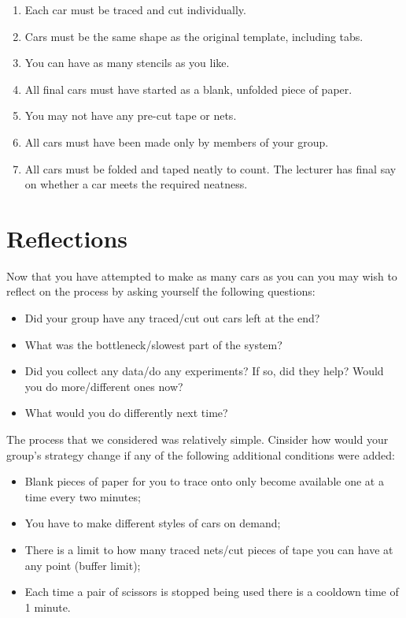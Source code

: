 \documentclass[
  10pt,
  a4paperpaper,
  DIV=11,
  numbers=noendperiod,
  oneside]{scrreprt}
\providecommand{\tightlist}{%
  \setlength{\itemsep}{0pt}\setlength{\parskip}{0pt}}\usepackage{longtable,booktabs,array}
\begin{document}
\begin{enumerate}
\def\labelenumi{\arabic{enumi}.}
\tightlist
\item
  Each car must be traced and cut individually.
\item
  Cars must be the same shape as the original template, including tabs.
\item
  You can have as many stencils as you like.
\item
  All final cars must have started as a blank, unfolded piece of paper.
\item
  You may not have any pre-cut tape or nets.
\item
  All cars must have been made only by members of your group.
\item
  All cars must be folded and taped neatly to count. The lecturer has
  final say on whether a car meets the required neatness.
\end{enumerate}

\section{Reflections}\label{reflections}

Now that you have attempted to make as many cars as you can you may wish
to reflect on the process by asking yourself the following questions:

\begin{itemize}
\tightlist
\item
  Did your group have any traced/cut out cars left at the end?
\item
  What was the bottleneck/slowest part of the system?
\item
  Did you collect any data/do any experiments? If so, did they help?
  Would you do more/different ones now?
\item
  What would you do differently next time?
\end{itemize}

The process that we considered was relatively simple. Cinsider how would
your group's strategy change if any of the following additional
conditions were added:

\begin{itemize}
\tightlist
\item
  Blank pieces of paper for you to trace onto only become available one
  at a time every two minutes;
\item
  You have to make different styles of cars on demand;
\item
  There is a limit to how many traced nets/cut pieces of tape you can
  have at any point (buffer limit);
\item
  Each time a pair of scissors is stopped being used there is a cooldown
  time of 1 minute.
\end{itemize}
\end{document}
